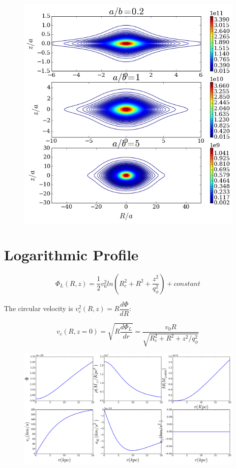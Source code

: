 \begin{figure}[H]\label{fig:MN_density}
\centering
\includegraphics[scale=0.7]{../figures/MN_density_contours.png}
\end{figure}

\section{Logarithmic Profile}\label{sec:log}

\begin{equation}
\Phi_L(R, z) = \dfrac{1}{2} v_0^2 ln \left( R_c^2 + R^2 + \dfrac{z^2}{q_{\phi}^2}  \right) + constant
\end{equation}

The circular velocity is $v_c^2(R, z) = R \dfrac{d \Phi}{dR}$:

\begin{equation}
v_c(R, z=0) =\sqrt{ R \dfrac{d \Phi_L}{dr}} = \dfrac{v_0 R}{\sqrt{R_c^2 + R^2 + z^2/q_{\phi}^2}}
\end{equation}



\begin{figure}[H]
\centering
\includegraphics[scale=0.35]{../figures/logarithmic.png}
\end{figure}

